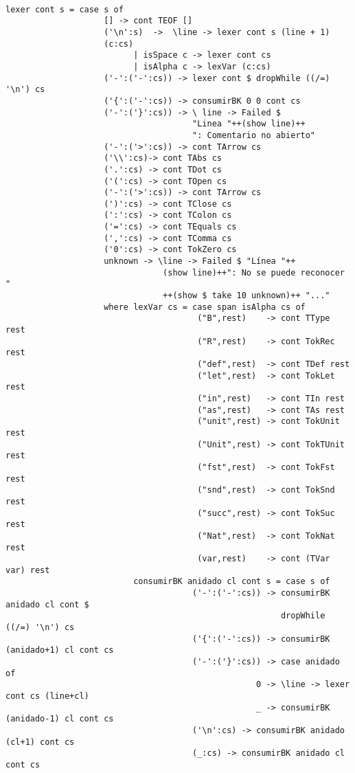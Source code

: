 \documentclass[a4paper]{article}
\begin{document}
\begin{lstlisting}

lexer cont s = case s of
                    [] -> cont TEOF []
                    ('\n':s)  ->  \line -> lexer cont s (line + 1)
                    (c:cs)
                          | isSpace c -> lexer cont cs
                          | isAlpha c -> lexVar (c:cs)
                    ('-':('-':cs)) -> lexer cont $ dropWhile ((/=) '\n') cs
                    ('{':('-':cs)) -> consumirBK 0 0 cont cs  
                    ('-':('}':cs)) -> \ line -> Failed $
                                      "Linea "++(show line)++
                                      ": Comentario no abierto"
                    ('-':('>':cs)) -> cont TArrow cs
                    ('\\':cs)-> cont TAbs cs
                    ('.':cs) -> cont TDot cs
                    ('(':cs) -> cont TOpen cs
                    ('-':('>':cs)) -> cont TArrow cs
                    (')':cs) -> cont TClose cs
                    (':':cs) -> cont TColon cs
                    ('=':cs) -> cont TEquals cs
                    (',':cs) -> cont TComma cs
                    ('0':cs) -> cont TokZero cs
                    unknown -> \line -> Failed $ "Línea "++
                                (show line)++": No se puede reconocer "
                                ++(show $ take 10 unknown)++ "..."
                    where lexVar cs = case span isAlpha cs of
                                       ("B",rest)    -> cont TType rest
                                       ("R",rest)    -> cont TokRec rest
                                       ("def",rest)  -> cont TDef rest
                                       ("let",rest)  -> cont TokLet rest
                                       ("in",rest)   -> cont TIn rest
                                       ("as",rest)   -> cont TAs rest
                                       ("unit",rest) -> cont TokUnit rest
                                       ("Unit",rest) -> cont TokTUnit rest
                                       ("fst",rest)  -> cont TokFst rest
                                       ("snd",rest)  -> cont TokSnd rest
                                       ("succ",rest) -> cont TokSuc rest
                                       ("Nat",rest)  -> cont TokNat rest
                                       (var,rest)    -> cont (TVar var) rest
                          consumirBK anidado cl cont s = case s of
                                      ('-':('-':cs)) -> consumirBK anidado cl cont $
                                                        dropWhile ((/=) '\n') cs
                                      ('{':('-':cs)) -> consumirBK (anidado+1) cl cont cs 
                                      ('-':('}':cs)) -> case anidado of
                                                   0 -> \line -> lexer cont cs (line+cl)
                                                   _ -> consumirBK (anidado-1) cl cont cs
                                      ('\n':cs) -> consumirBK anidado (cl+1) cont cs
                                      (_:cs) -> consumirBK anidado cl cont cs     
                                           

\end{lstlisting}
\end{document}
